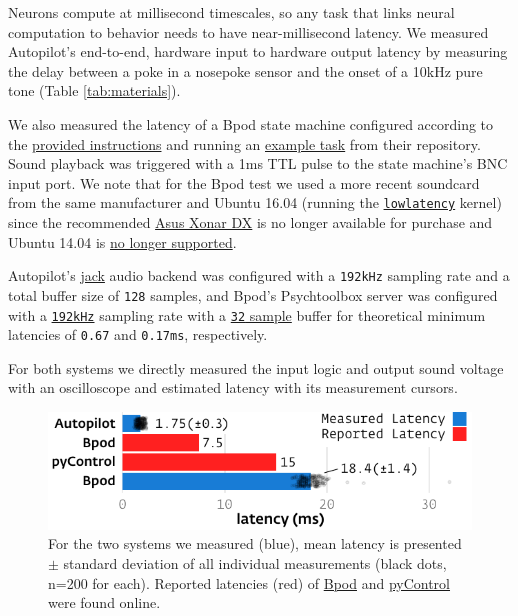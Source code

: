 \documentclass[nohyper, justified, notitlepage, marginals=raggedright,twoside=false,debug]{tufte-autopilot}
\begin{document}
Neurons compute at millisecond timescales, so any task that links neural computation to behavior needs to have near-millisecond latency. We measured Autopilot's end-to-end, hardware input to hardware output latency by measuring the delay between a poke in a nosepoke sensor and the onset of a 10kHz pure tone (Table \ref{tab:materials}). 

We also measured the latency of a Bpod state machine configured according to the \href{https://sites.google.com/site/bpoddocumentation/installing-bpod/ubuntu14}{provided instructions} and running an \href{https://github.com/sanworks/Bpod_Gen2/blob/master/Examples/Protocols/PsychToolboxSound/PsychToolboxSound.m}{example task} from their repository. Sound playback was triggered with a 1ms TTL pulse to the state machine's BNC input port. We note that for the Bpod test we used a more recent soundcard from the same manufacturer and Ubuntu 16.04 (running the \href{https://help.ubuntu.com/community/UbuntuStudio/RealTimeKernel}{\texttt{lowlatency}} kernel) since the recommended \href{https://www.asus.com/us/Sound-Cards/Xonar_DX/}{Asus Xonar DX} is no longer available for purchase and Ubuntu 14.04 is \href{https://ubuntu.com/blog/ubuntu-14-04-trusty-tahr}{no longer supported}.

Autopilot's \href{http://jackaudio.org/}{jack} audio backend was configured with a \texttt{192kHz} sampling rate and a total buffer size of \texttt{128} samples, and Bpod's Psychtoolbox server was configured with a \href{https://github.com/sanworks/Bpod_Gen2/blob/825eaf6ea2cb11da956ee21c42876c4363e9c14e/Functions/Plugins/PsychToolboxAudio/PsychToolboxAudio.m#L25}{\texttt{192kHz}} sampling rate with a \href{https://github.com/sanworks/Bpod_Gen2/blob/825eaf6ea2cb11da956ee21c42876c4363e9c14e/Functions/Plugins/PsychToolboxAudio/PsychToolboxAudio.m#L122}{\texttt{32} sample} buffer for theoretical minimum latencies of \texttt{0.67} and \texttt{0.17ms}, respectively.

For both systems we directly measured the input logic and output sound voltage with an oscilloscope and estimated latency with its measurement cursors. %
%
\begin{figure}[hb!]
\caption{For the two systems we measured (blue), mean latency is presented $\pm$ standard deviation of all individual measurements (black dots, n=200 for each). Reported latencies (red) of \href{https://sites.google.com/site/bpoddocumentation/bpod-user-guide/function-reference/psychtoolboxsoundserver}{Bpod} and \href{https://pycontrol.readthedocs.io/en/latest/user-guide/hardware/\#audio_player}{pyControl} were found online.}
\label{fig:lags}
\includegraphics{figures/test_1_lags.pdf}
\end{figure}
\end{document}
